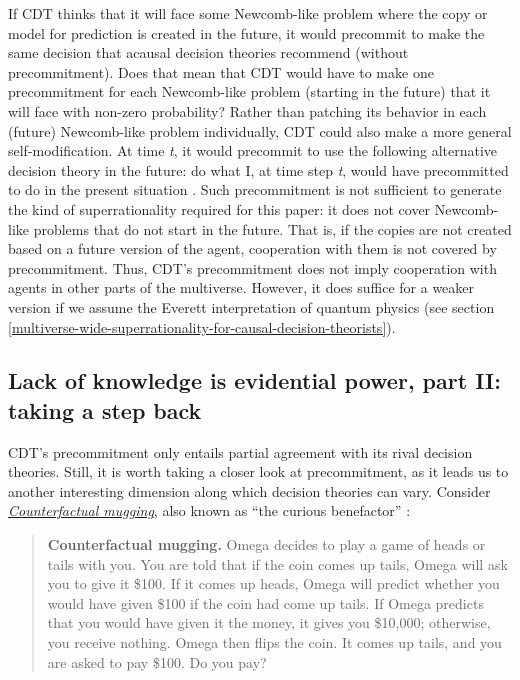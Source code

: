If CDT thinks that it will face some Newcomb-like problem where the copy
or model for prediction is created in the future, it would precommit to
make the same decision that acausal decision theories recommend (without
precommitment). Does that mean that CDT would have to make one
precommitment for each Newcomb-like problem (starting in the future)
that it will face with non-zero probability? Rather than patching its
behavior in each (future) Newcomb-like problem individually, CDT could
also make a more general self-modification. At time \emph{t}, it would
precommit to use the following alternative decision theory in the
future: do what I, at time step \emph{t}, would have precommitted to do
in the present situation
\parencite{Yudkowsky2010-ky,Soares2015-is,Meacham2010-pk}.
Such precommitment is not sufficient to generate the kind of
superrationality required for this paper: it does not cover Newcomb-like
problems that do not start in the future. That is, if the copies are not
created based on a future version of the agent, cooperation with them is
not covered by precommitment. Thus, CDT's precommitment does not imply
cooperation with agents in other parts of the multiverse. However, it
does suffice for a weaker version if we assume the Everett
interpretation of quantum physics (see section
\ref{multiverse-wide-superrationality-for-causal-decision-theorists}).

\hypertarget{lack-of-knowledge-is-evidential-power-part-ii-taking-a-step-back}{\subsection{Lack
of knowledge is evidential power, part II: taking a step
back}\label{lack-of-knowledge-is-evidential-power-part-ii-taking-a-step-back}}

CDT's precommitment only entails partial agreement with its rival
decision theories. Still, it is worth taking a closer look at
precommitment, as it leads us to another interesting dimension along
which decision theories can vary. Consider
\href{https://wiki.lesswrong.com/wiki/Counterfactual_mugging}{\emph{Counterfactual
mugging}}, also known as ``the curious benefactor''
\parencite{Hintze2014-xs}:

\begin{quote}
\textbf{Counterfactual mugging.} Omega decides to play a game of heads
or tails with you. You are told that if the coin comes up tails, Omega
will ask you to give it \$100. If it comes up heads, Omega will predict
whether you would have given \$100 if the coin had come up tails. If
Omega predicts that you would have given it the money, it gives you
\$10,000; otherwise, you receive nothing. Omega then flips the coin. It
comes up tails, and you are asked to pay \$100. Do you pay?
\end{quote}

